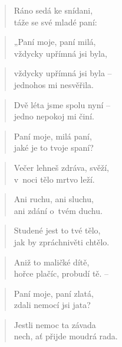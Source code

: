 
\begin{verse}
Ráno sedá ke snídani, \\
táže se své mladé paní:
\end{verse}

\begin{verse}
„Paní moje, paní milá, \\
vždycky upřímná jsi byla,
\end{verse}

\begin{verse}
vždycky upřímná jsi byla -- \\
jednohos mi nesvěřila.
\end{verse}

\begin{verse}
Dvě léta jsme spolu nyní -- \\
jedno nepokoj mi činí.
\end{verse}

\begin{verse}
Paní moje, milá paní, \\
jaké je to tvoje spaní?
\end{verse}

\begin{verse}
Večer lehneš zdráva, svěží, \\
v~noci tělo mrtvo leží.
\end{verse}

\begin{verse}
Ani ruchu, ani sluchu, \\
ani zdání o~tvém duchu.
\end{verse}

\begin{verse}
Studené jest to tvé tělo, \\
jak by zpráchnivěti chtělo.
\end{verse}

\begin{verse}
Aniž to maličké dítě, \\
hořce plačíc, probudí tě. --
\end{verse}

\begin{verse}
Paní moje, paní zlatá, \\
zdali nemocí jsi jata?
\end{verse}

\begin{verse}
Jestli nemoc ta závada \\
nech, ať přijde moudrá rada.
\end{verse}

